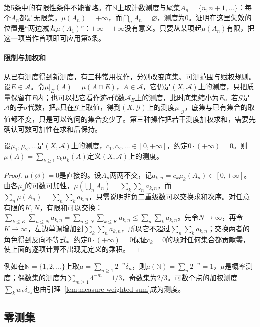 第5条中的有限性条件不能省略。在$\mathbb N$上取计数测度与尾集$A_n=\{n,n+1,\dots\}$：每个$A_n$都是无限集，$\mu(A_n)=+\infty$，而$\bigcap_nA_n=\varnothing$，测度为$0$。证明在这里失效的位置是“两边减去$\mu(A_1)$”：$+\infty-+\infty$没有意义。只要从某项起$\mu(A_n)$有限，把这一项当作首项即可应用第5条。

\paragraph{限制与加权和}
从已有测度得到新测度，有三种常用操作，分别改变底集、可测范围与赋权规则。设$E\in\mathcal A$。令$\mu|_E(A)=\mu(A\cap E)$，$A\in\mathcal A$，它仍是$(X,\mathcal A)$上的测度，只把质量保留在$E$内；也可以把它看作迹$\sigma$代数$\mathcal A_E$上的测度，此时底集缩小为$E$。若$\mathcal G$是$\mathcal A$的子$\sigma$代数，把$\mu$只在$\mathcal G$上取值，得到$(X,\mathcal G)$上的测度$\mu|_{\mathcal G}$，底集与已有集合的取值都不变，只是可以询问的集合变少了。第三种操作把若干测度加权求和，需要先确认可数可加性在求和后保持。

\begin{lemma}[测度的可数加权和]
\label{lem:measure-weighted-sum}
设$\mu_1,\mu_2,\dots$是$(X,\mathcal A)$上的测度，$c_1,c_2,\dots\in[0,+\infty]$，约定$0\cdot(+\infty)=0$。则$\mu(A)=\sum_{k\ge1}c_k\mu_k(A)$定义$(X,\mathcal A)$上的测度。
\end{lemma}

\begin{proof}
$\mu(\varnothing)=0$是直接的。设$A_n$两两不交，记$a_{k,n}=c_k\mu_k(A_n)\in[0,+\infty]$。由各$\mu_k$的可数可加性，$\mu(\bigcup_nA_n)=\sum_k\sum_na_{k,n}$，而$\sum_n\mu(A_n)=\sum_n\sum_ka_{k,n}$，只需说明非负二重级数可以交换求和次序。对任意有限的$K,N$，有限和可以交换：$\sum_{k\le K}\sum_{n\le N}a_{k,n}=\sum_{n\le N}\sum_{k\le K}a_{k,n}\le\sum_n\sum_ka_{k,n}$。先令$N\to\infty$，再令$K\to\infty$，左边单调增加到$\sum_k\sum_na_{k,n}$，所以它不超过$\sum_n\sum_ka_{k,n}$；交换两者的角色得到反向不等式。约定$0\cdot(+\infty)=0$保证$c_k=0$的项对任何集合都贡献零，使上面的逐项计算不出现无定义的乘积。
\end{proof}

例如在$\mathbb N=\{1,2,\dots\}$上取$\mu=\sum_{n\ge1}2^{-n}\delta_n$，则$\mu(\mathbb N)=\sum_n2^{-n}=1$，$\mu$是概率测度；偶数集的测度为$\sum_{m\ge1}4^{-m}=1/3$，奇数集为$2/3$。可数个点的加权测度$\sum_kw_k\delta_{x_k}$也由引理~\ref{lem:measure-weighted-sum}成为测度。

\subsection{零测集}
\label{sec:measure-null-sets}

